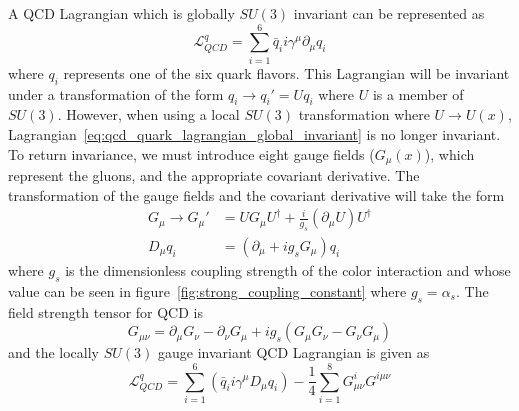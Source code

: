 A QCD Lagrangian which is globally $SU\left(3\right)$ invariant can be represented as
\begin{equation}\label{eq:qcd_quark_lagrangian_global_invariant}
	\mathcal{L}_{QCD}^{q}=\sum_{i=1}^{6}\bar{q}_{i}i\gamma^{\mu}\partial_{\mu}q_{i}
\end{equation}
where $q_{i}$ represents one of the six quark flavors.
This Lagrangian will be invariant under a transformation of the form $q_{i}{\rightarrow}q_{i}'=Uq_{i}$ where $U$ is a member of $SU\left(3\right)$.
However, when using a local $SU\left(3\right)$ transformation where $U{\rightarrow}U\left(x\right)$, Lagrangian~\ref{eq:qcd_quark_lagrangian_global_invariant} is no longer invariant.
To return invariance, we must introduce eight gauge fields ($G_{\mu}\left(x\right)$), which represent the gluons, and the appropriate covariant derivative.
The transformation of the gauge fields and the covariant derivative will take the form
\begin{align}
	G_{\mu}{\rightarrow}G_{\mu}'&=UG_{\mu}U^{\dagger}+\frac{i}{g_{s}}\left(\partial_{\mu}U\right)U^{\dagger}\\
	D_{\mu}q_{i}&=\left(\partial_{\mu}+ig_{s}G_{\mu}\right)q_{i}
\end{align}
where $g_{s}$ is the dimensionless coupling strength of the color interaction and whose value can be seen in figure~\ref{fig:strong_coupling_constant} where $g_{s}=\alpha_{s}$.
The field strength tensor for QCD is
\begin{equation}
	G_{\mu\nu}=\partial_{\mu}G_{\nu}-\partial_{\nu}G_{\mu}+ig_{s}\left(G_{\mu}G_{\nu}-G_{\nu}G_{\mu}\right)
\end{equation}
and the locally $SU\left(3\right)$ gauge invariant QCD Lagrangian is given as
\begin{equation}\label{eq:qcd_quark_lagrangian}
	\mathcal{L}_{QCD}^{q}=\sum_{i=1}^{6}\left(\bar{q}_{i}i\gamma^{\mu}D_{\mu}q_{i}\right)-\frac{1}{4}\sum_{i=1}^{8}G_{\mu\nu}^{i}G^{i\mu\nu}
\end{equation}

